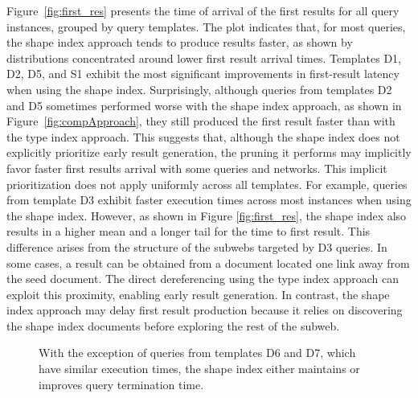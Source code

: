 Figure~\ref{fig:first_res} presents the time of arrival of the first results for all query instances, grouped by query templates. 
The plot indicates that, for most queries, the shape index approach tends to produce results faster, as shown by distributions concentrated around lower first result arrival times.
Templates D1, D2, D5, and S1 exhibit the most significant improvements in first-result latency when using the shape index.
Surprisingly, although queries from templates D2 and D5 sometimes performed worse with the shape index approach, as shown in Figure~\ref{fig:compApproach}, they still produced the first result faster than with the type index approach.
This suggests that, although the shape index does not explicitly prioritize early result generation, the pruning it performs may implicitly favor faster first results arrival with some queries and networks. 
This implicit prioritization does not apply uniformly across all templates. 
For example, queries from template D3 exhibit faster execution times across most instances when using the shape index.
However, as shown in Figure \ref{fig:first_res}, the shape index also results in a higher mean and a longer tail for the time to first result.
This difference arises from the structure of the subwebs targeted by D3 queries.
In some cases, a result can be obtained from a document located one link away from the seed document.
The direct dereferencing using the type index approach can exploit this proximity, enabling early result generation.
In contrast, the shape index approach may delay first result production because it relies on discovering the shape index documents before exploring the rest of the subweb.

\begin{figure}
    \centering
    
    \caption{With the exception of queries from templates D6 and D7, which have similar execution times, the shape index either maintains or improves query termination time.}
    \label{fig:termination_time}
\end{figure}

